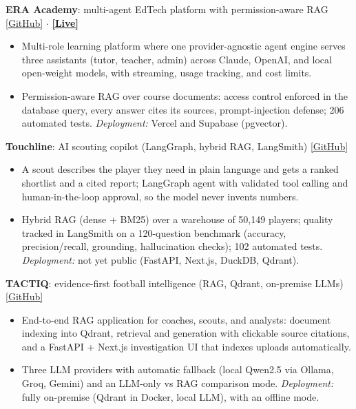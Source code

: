 \documentclass[10pt,a4paper]{article}
\begin{document}
\textbf{ERA Academy}: multi-agent EdTech platform with permission-aware RAG \hfill \href{https://github.com/malikov-davronbek/ERA/tree/phase-1-foundation}{[GitHub]} $\cdot$ \href{https://era-academy.vercel.app}{\textbf{[Live]}}
\begin{itemize}
    \item Multi-role learning platform where one provider-agnostic agent engine serves three assistants (tutor, teacher, admin) across Claude, OpenAI, and local open-weight models, with streaming, usage tracking, and cost limits.
    \item Permission-aware RAG over course documents: access control enforced in the database query, every answer cites its sources, prompt-injection defense; 206 automated tests. \textit{Deployment:} Vercel and Supabase (pgvector).
\end{itemize}

\textbf{Touchline}: AI scouting copilot (LangGraph, hybrid RAG, LangSmith) \hfill \href{https://github.com/davronbek-malikov/touchline}{[GitHub]}
\begin{itemize}
    \item A scout describes the player they need in plain language and gets a ranked shortlist and a cited report; LangGraph agent with validated tool calling and human-in-the-loop approval, so the model never invents numbers.
    \item Hybrid RAG (dense + BM25) over a warehouse of 50,149 players; quality tracked in LangSmith on a 120-question benchmark (accuracy, precision/recall, grounding, hallucination checks); 102 automated tests. \textit{Deployment:} not yet public (FastAPI, Next.js, DuckDB, Qdrant).
\end{itemize}

\textbf{TACTIQ}: evidence-first football intelligence (RAG, Qdrant, on-premise LLMs) \hfill \href{https://github.com/davronbek-malikov/TACTIQ}{[GitHub]}
\begin{itemize}
    \item End-to-end RAG application for coaches, scouts, and analysts: document indexing into Qdrant, retrieval and generation with clickable source citations, and a FastAPI + Next.js investigation UI that indexes uploads automatically.
    \item Three LLM providers with automatic fallback (local Qwen2.5 via Ollama, Groq, Gemini) and an LLM-only vs RAG comparison mode. \textit{Deployment:} fully on-premise (Qdrant in Docker, local LLM), with an offline mode.
\end{itemize}
\end{document}
